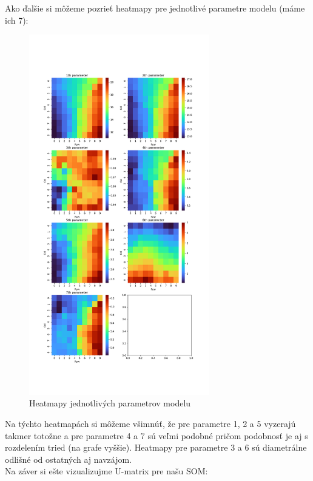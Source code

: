 \documentclass[a4paper]{article}
\begin{document}
	
	\newpage
	
	Ako ďalšie si môžeme pozrieť heatmapy pre jednotlivé parametre modelu (máme ich 7):
	
	\begin{figure}[!h]
		\centering
		\includegraphics[width=0.7\textwidth]{../param_heatmaps.png}
		\caption{Heatmapy jednotlivých parametrov modelu}
	\end{figure}

	Na týchto heatmapách si môžeme všimnúť, že pre parametre 1, 2 a 5 vyzerajú takmer totožne a pre parametre 4 a 7 sú veľmi podobné pričom podobnosť je aj s rozdelením tried (na grafe vyššie). Heatmapy pre parametre 3 a 6 sú diametrálne odlišné od ostatných aj navzájom.
	\\
	
	Na záver si ešte vizualizujme U-matrix pre našu SOM:
	
\end{document}
